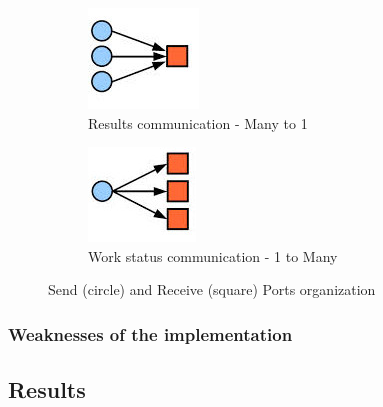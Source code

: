 \documentclass[a4paper]{article}
\begin{document}
\begin{figure}
\begin{subfigure}{0.5\textwidth}
\centering
\includegraphics[width=0.5\linewidth]{results}
\caption{Results communication - Many to 1} \label{fig:ca}
\end{subfigure}
\hspace*{\fill} %
\begin{subfigure}{0.5\textwidth}
\centering
\includegraphics[width=0.5\linewidth]{continue}
\caption{Work status communication - 1 to Many} \label{fig:cb}
\end{subfigure}
\caption{Send (circle) and Receive (square) Ports organization} \label{fig:ports}
\end{figure}
\FloatBarrier

\subsubsection{Weaknesses of the implementation}
\label{sec:wi}

\subsection{Results}
\label{sec:results}


\printbibliography 
\end{document}
